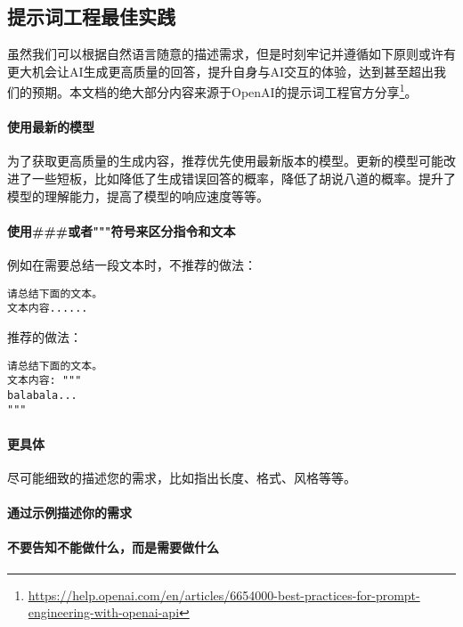 \documentclass[../../../dolphin-book-2023.tex]{subfiles}
\begin{document}
\subsection{提示词工程最佳实践}

虽然我们可以根据自然语言随意的描述需求，但是时刻牢记并遵循如下原则或许有更大机会让AI生成更高质量的回答，提升自身与AI交互的体验，达到甚至超出我们的预期。本文档的绝大部分内容来源于OpenAI的提示词工程官方分享\footnote{\url{https://help.openai.com/en/articles/6654000-best-practices-for-prompt-engineering-with-openai-api}}。

\paragraph{使用最新的模型}为了获取更高质量的生成内容，推荐优先使用最新版本的模型。更新的模型可能改进了一些短板，比如降低了生成错误回答的概率，降低了胡说八道的概率。提升了模型的理解能力，提高了模型的响应速度等等。

\paragraph{使用\#\#\#或者"""符号来区分指令和文本}例如在需要总结一段文本时，不推荐的做法：

\begin{lstlisting}
请总结下面的文本。
文本内容......
\end{lstlisting}

推荐的做法：

\begin{lstlisting}
请总结下面的文本。
文本内容: """
balabala... 
"""
\end{lstlisting}

\paragraph{更具体}尽可能细致的描述您的需求，比如指出长度、格式、风格等等。

\paragraph{通过示例描述你的需求}

\paragraph{不要告知不能做什么，而是需要做什么}
\end{document}
